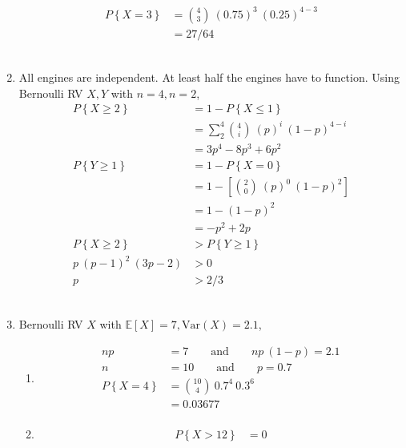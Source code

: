 \begin{enumerate}
	
		\begin{align}
			P \left\{X = 3 \right\} &= \binom{4}{3}\ (0.75)^3\ (0.25)^{4-3}  \\
			&= 27/64 \nonumber
		\end{align}\\
	 
	
	\item All engines are independent. At least half the engines have to function. Using Bernoulli RV $ X, Y $ with $ n = 4, n = 2 $, \\
	
	
		\begin{align}
			P \left\{X \geq 2 \right\} &= 1 - P \left\{X \leq 1 \right\} \\
			&= \sum\limits_{2}^{4} \binom{4}{i}\ (p)^i\ (1-p)^{4-i} \nonumber \\
			&= 3p^4 - 8p^3 + 6p^2 \\
			P \left\{Y \geq 1 \right\} &= 1 - P \left\{X = 0 \right\} \\
			&= 1 - \left[\binom{2}{0}\ (p)^0\ (1-p)^{2}\right] \nonumber \\
			&= 1 - (1-p)^2 \nonumber \\
			&= -p^2 + 2p \\
			P \left\{X \geq 2 \right\} &> P \left\{Y \geq 1 \right\} \\
			p\ (p-1)^2\ (3p-2) &> 0 \nonumber \\
			p &> 2/3
		\end{align}\\
	 
	
	\item Bernoulli RV $ X $ with $ \mathbb{E}[X] = 7, \mathrm{Var}(X) = 2.1 $, \\
	
	
		\begin{enumerate}
			\item \begin{align}
				np &= 7 \qquad \text{and} \qquad np\ (1-p) = 2.1 \nonumber \\
				n &= 10  \qquad \text{and} \qquad p = 0.7 \nonumber \\
				P \left\{X = 4\right\} &= \binom{10}{4} \ 0.7^4 \ 0.3^6 \nonumber \\
				&= 0.03677 \\
			\end{align}
			
			\item \begin{align}
				P \left\{X > 12\right\} &= 0
			\end{align}
		\end{enumerate}
	

\end{enumerate}
